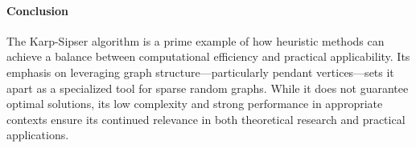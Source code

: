 \paragraph{Conclusion}
The Karp-Sipser algorithm is a prime example of how heuristic methods can achieve a balance between computational efficiency and practical applicability. Its emphasis on leveraging graph structure—particularly pendant vertices—sets it apart as a specialized tool for sparse random graphs. While it does not guarantee optimal solutions, its low complexity and strong performance in appropriate contexts ensure its continued relevance in both theoretical research and practical applications.
